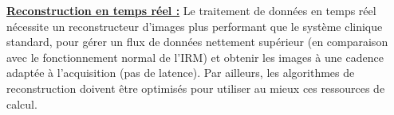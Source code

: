 
\underline{\textbf{Reconstruction en temps réel :}} Le traitement de données en temps réel nécessite un reconstructeur d’images plus performant que le système clinique standard, pour gérer un flux de données nettement supérieur (en comparaison avec le fonctionnement normal de l’IRM) et obtenir les images à une cadence adaptée à l’acquisition (pas de latence). Par ailleurs, les algorithmes de reconstruction doivent être optimisés pour utiliser au mieux ces ressources de calcul.\\
